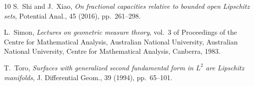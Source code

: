 \documentclass[12pt]{article}
\theoremstyle{plain}
\numberwithin{equation}{section}
\begin{document}
\begin{thebibliography}{10}
{\sc S.~Shi and J.~Xiao}, {\em On fractional capacities relative to bounded
  open {L}ipschitz sets}, Potential Anal., 45 (2016), pp.~261--298.

{\sc L.~Simon}, {\em Lectures on geometric measure theory}, vol.~3 of
  Proceedings of the Centre for Mathematical Analysis, Australian National
  University, Australian National University, Centre for Mathematical Analysis,
  Canberra, 1983.

{\sc T.~Toro}, {\em Surfaces with generalized second fundamental form in
  {$L^2$} are {L}ipschitz manifolds}, J. Differential Geom., 39 (1994),
  pp.~65--101.

\end{thebibliography}
\end{document}
